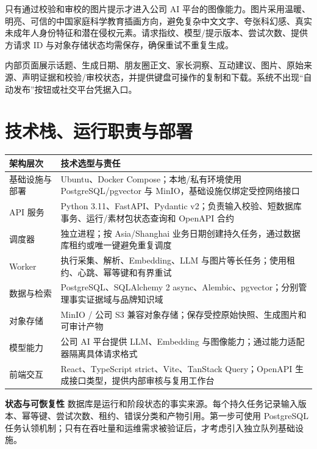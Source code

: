 \documentclass[UTF8,11pt,a4paper,fontset=none]{ctexart}
\begin{document}
只有通过校验和审校的图片提示才进入公司 AI 平台的图像能力。图片采用温暖、明亮、可信的中国家庭科学教育插画方向，避免复杂中文文字、夸张科幻感、真实未成年人身份特征和潜在侵权元素。请求指纹、模型/提示版本、尝试次数、提供方请求 ID 与对象存储状态均需保存，确保重试不重复生成。

内部页面展示话题、生成日期、朋友圈正文、家长洞察、互动建议、图片、原始来源、声明证据和校验/审校状态，并提供键盘可操作的复制和下载。系统不出现“自动发布”按钮或社交平台凭据入口。

\section{技术栈、运行职责与部署}

\noindent\begin{tabularx}{\textwidth}{L{3cm}Y}
\toprule
{}
\color{white}\bfseries\sffamily 架构层次 &
\color{white}\bfseries\sffamily 技术选型与责任 \\
\midrule
基础设施与部署 & Ubuntu、Docker Compose；本地/私有环境使用 PostgreSQL/pgvector 与 MinIO，基础设施仅绑定受控网络接口 \\
API 服务 & Python 3.11、FastAPI、Pydantic v2；负责输入校验、短数据库事务、运行/素材包状态查询和 OpenAPI 合约 \\
调度器 & 独立进程；按 Asia/Shanghai 业务日期创建持久任务，通过数据库租约或唯一键避免重复调度 \\
Worker & 执行采集、解析、Embedding、LLM 与图片等长任务；使用租约、心跳、幂等键和有界重试 \\
数据与检索 & PostgreSQL、SQLAlchemy 2 async、Alembic、pgvector；分别管理事实证据域与品牌知识域 \\
对象存储 & MinIO / 公司 S3 兼容对象存储；保存受控原始快照、生成图片和可审计产物 \\
模型能力 & 公司 AI 平台提供 LLM、Embedding 与图像能力；通过能力适配器隔离具体请求格式 \\
前端交互 & React、TypeScript strict、Vite、TanStack Query；OpenAPI 生成接口类型，提供内部审核与复用工作台 \\
\bottomrule
\end{tabularx}

\begin{infobox}
\textbf{\sffamily\color{navy}状态与可恢复性}\quad
数据库是运行和阶段状态的事实来源。每个持久任务记录输入版本、幂等键、尝试次数、租约、错误分类和产物引用。第一步可使用 PostgreSQL 任务认领机制；只有在吞吐量和运维需求被验证后，才考虑引入独立队列基础设施。
\end{infobox}
\end{document}
